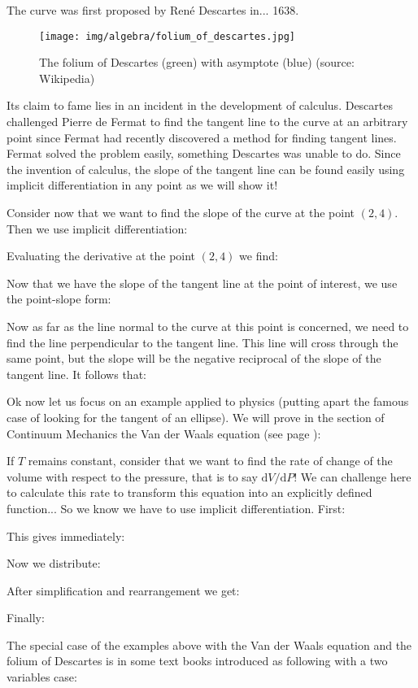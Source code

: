	The curve was first proposed by René Descartes in... 1638.
	\begin{figure}[H]
		\centering
			\texttt{[image: img/algebra/folium\_of\_descartes.jpg]}
		\caption[The folium of Descartes with asymptote]{The folium of Descartes (green) with asymptote (blue) (source: Wikipedia)}
	\end{figure}
	Its claim to fame lies in an incident in the development of calculus. Descartes challenged Pierre de Fermat to find the tangent line to the curve at an arbitrary point since Fermat had recently discovered a method for finding tangent lines. Fermat solved the problem easily, something Descartes was unable to do. Since the invention of calculus, the slope of the tangent line can be found easily using implicit differentiation in any point as we will show it!
	
	Consider now that we want to find the slope of the curve at the point $(2,4)$. Then we use implicit differentiation: 
	
	Evaluating the derivative at the point $(2,4)$ we find:
	
	Now that we have the slope of the tangent line at the point of interest, we use the point-slope form:
	
	Now as far as the line normal to the curve at this point is concerned, we need to find the line perpendicular to the tangent line. This line will cross through the same point, but the slope will be the negative reciprocal of the slope of the tangent line. It follows that:
	
	Ok now let us focus on an example applied to physics (putting apart the famous case of looking for the tangent of an ellipse). We will prove in the section of Continuum Mechanics the Van der Waals equation (see page \pageref{Van der Waals state equation}):
	
	If $T$ remains constant, consider that we want to find the rate of change of the volume with respect to the pressure, that is to say $\mathrm{d}V/\mathrm{d}P$! We can challenge here to calculate this rate to transform this equation into an explicitly defined function... So we know we have to use implicit differentiation. First:
	
	This gives immediately:
	
	Now we distribute:
	
	After simplification and rearrangement we get:
	
	Finally:
	
	The special case of the examples above with the Van der Waals equation and the folium of Descartes is in some text books introduced as following with a two variables case:
	
